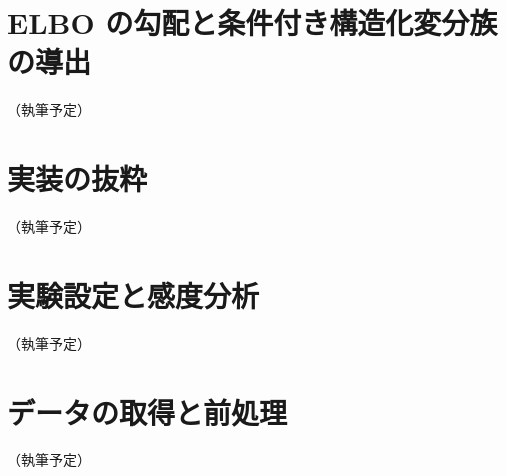 \section{ELBO の勾配と条件付き構造化変分族の導出}\label{app:derivation}

（執筆予定）

\section{実装の抜粋}\label{app:code}

（執筆予定）

\section{実験設定と感度分析}\label{app:settings}

（執筆予定）

\section{データの取得と前処理}\label{app:data}

（執筆予定）
